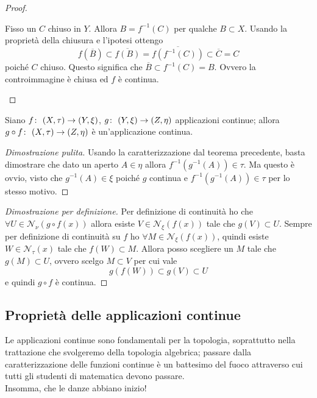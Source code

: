 \begin{proof}
\begin{enumerate}
		Fisso un $C$ chiuso in $Y$. Allora $B = f^{-1}(C)$ per qualche $B \subset X$. Usando la proprietà della chiusura e l'ipotesi ottengo  
		\begin{equation*}
			f(\overline{B}) \subset \overline{f(B)} = \overline{f(f^{-1}(C))} \subset \overline{C} = C
		\end{equation*}
		poiché $C$ chiuso. Questo significa che $\overline{B} \subset f^{-1}(C) = B$. Ovvero la controimmagine è chiusa ed $f$ è continua.
\end{enumerate}
\end{proof}

\begin{theorem}
	Siano $f \colon\ (X, \tau) \rightarrow (Y, \xi)$, $g \colon\ (Y,\xi) \rightarrow (Z, \eta)$ applicazioni continue; allora $g \circ f \colon\ (X,\tau) \rightarrow (Z,\eta)$ è un'applicazione continua.
\end{theorem}
\begin{proof}[Dimostrazione pulita]
	Usando la caratterizzazione dal teorema precedente, basta dimostrare che dato un aperto $A \in \eta$ allora $f^{-1}(g^{-1}(A)) \in \tau$. Ma questo è ovvio, visto che $g^{-1}(A) \in \xi$ poiché $g$ continua e $f^{-1}(g^{-1}(A)) \in \tau$ per lo stesso motivo.  
\end{proof}
\begin{proof}[Dimostrazione per definizione]
	Per definizione di continuità ho che $\forall U \in \mathcal{N}_\nu(g \circ f (x))$ allora esiste $V \in \mathcal{N}_\xi(f(x))$ tale che $g(V) \subset U$. Sempre per definizione di continuità su $f$ ho $\forall M \in \mathcal{N}_\xi(f (x))$, quindi esiste $W \in \mathcal{N}_\tau(x)$ tale che $f(W) \subset M$. Allora posso scegliere un $M$ tale che $g(M) \subset U$, ovvero scelgo $M \subset V$ per cui vale 
	\begin{equation*}
		g(f(W)) \subset g(V) \subset U
	\end{equation*}
	e quindi $g \circ f$ è continua.
\end{proof}



\subsection{\textcolor{TopGener}{\textbf{Proprietà delle applicazioni continue}}}
Le applicazioni continue sono fondamentali per la topologia, soprattutto nella trattazione che svolgeremo della topologia algebrica; passare dalla caratterizzazione delle funzioni continue è un battesimo del fuoco attraverso cui tutti gli studenti di matematica devono passare. \\ Insomma, che le danze abbiano inizio!



